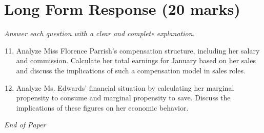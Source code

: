 \documentclass[12pt]{article}
\begin{document}
\section*{Long Form Response (20 marks)}
\textit{Answer each question with a clear and complete explanation.}
\begin{enumerate}[label=\arabic*.]
\setcounter{enumi}{10}
\item Analyze Miss Florence Parrish's compensation structure, including her salary and commission. Calculate her total earnings for January based on her sales and discuss the implications of such a compensation model in sales roles.
\item Analyze Ms. Edwards' financial situation by calculating her marginal propensity to consume and marginal propensity to save. Discuss the implications of these figures on her economic behavior.
\end{enumerate}

\vfill
\noindent\textit{End of Paper}
\end{document}
